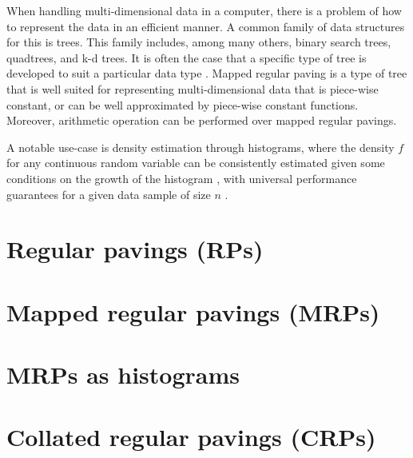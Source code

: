 \documentclass[../main.tex]{subfiles}
\begin{document}
  When handling multi-dimensional data in a computer, 
  there is a problem of how to represent the data in an efficient manner.
  A common family of data structures for this is trees.
  This family includes, among many others, binary search trees, quadtrees, and k-d trees.
  It is often the case that a specific type of tree is 
  developed to suit a particular data type \cite{mrp-raaz-harlow-tucker}.
  Mapped regular paving is a type of tree that is well suited for 
  representing multi-dimensional data that is piece-wise constant, or 
  can be well approximated by piece-wise constant functions.
  Moreover, arithmetic operation can be performed over mapped regular pavings.

  A notable use-case is density estimation through histograms, 
  where the density $f$ for any continuous random variable can be 
  consistently estimated given some conditions on the growth of the histogram 
  \cite{histogram-consistency-nobel-lugosi},
  with universal performance guarantees for a given data sample of size $n$ \cite{devroye-lugosi}.

  \section{Regular pavings (RPs)}
    

  \section{Mapped regular pavings (MRPs)}
    

  \section{MRPs as histograms}
    

  \section{Collated regular pavings (CRPs)}
    
\end{document}
